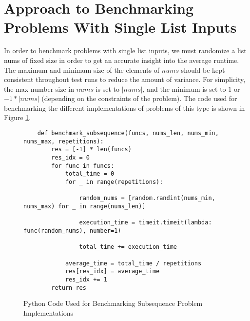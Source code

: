 \section{Approach to Benchmarking Problems With Single List Inputs}
In order to benchmark problems with single list inputs, we must randomize a list nums of fixed size in order to get an accurate insight into the average runtime.
The maximum and minimum size of the elements of $nums$ should be kept consistent throughout test runs to reduce the amount of variance.
For simplicity, the max number size in $nums$ is set to $|nums|$, and the minimum is set to $1$ or $-1 * |nums|$ (depending on the constraints of the problem).
The code used for benchmarking the different implementations of problems of this type is shown in Figure \ref{fig:bm-subsequence}.

\begin{figure}[H]
    \centering
    \begin{lstlisting}
    def benchmark_subsequence(funcs, nums_len, nums_min, nums_max, repetitions):
        res = [-1] * len(funcs)
        res_idx = 0
        for func in funcs:
            total_time = 0
            for _ in range(repetitions):
    
                random_nums = [random.randint(nums_min, nums_max) for _ in range(nums_len)]
                
                execution_time = timeit.timeit(lambda: func(random_nums), number=1)
    
                total_time += execution_time
    
            average_time = total_time / repetitions
            res[res_idx] = average_time
            res_idx += 1
        return res
    \end{lstlisting}
    \caption{Python Code Used for Benchmarking Subsequence Problem Implementations}
    \label{fig:bm-subsequence}
\end{figure}

